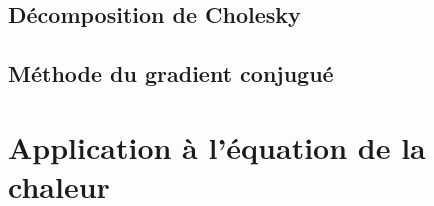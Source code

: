 \documentclass{article}
\begin{document}
\subsection{Décomposition de Cholesky}

\subsection{Méthode du gradient conjugué}

\section{Application à l'équation de la chaleur}
\end{document}
